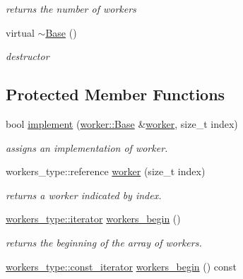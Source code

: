 \begin{DoxyCompactItemize}
\begin{DoxyCompactList}\small\item\em returns the number of workers \end{DoxyCompactList}\item 
virtual \hyperlink{classhryky_1_1task_1_1distributor_1_1_base_a722da881b6c70cfcbde9243abcfbf334}{$\sim$\-Base} ()
\begin{DoxyCompactList}\small\item\em destructor \end{DoxyCompactList}\end{DoxyCompactItemize}
\subsection*{Protected Member Functions}
\begin{DoxyCompactItemize}
\item 
bool \hyperlink{classhryky_1_1task_1_1distributor_1_1_base_aaed765a0ab4b2f79082ca8b66251dc7a}{implement} (\hyperlink{classhryky_1_1task_1_1worker_1_1_base}{worker\-::\-Base} \&\hyperlink{classhryky_1_1task_1_1distributor_1_1_base_a69590e9a4cbe85a69eeb6d5477e994cd}{worker}, size\-\_\-t index)
\begin{DoxyCompactList}\small\item\em assigns an implementation of worker. \end{DoxyCompactList}\item 
\hypertarget{classhryky_1_1task_1_1distributor_1_1_base_a69590e9a4cbe85a69eeb6d5477e994cd}{workers\-\_\-type\-::reference \hyperlink{classhryky_1_1task_1_1distributor_1_1_base_a69590e9a4cbe85a69eeb6d5477e994cd}{worker} (size\-\_\-t index)}\label{classhryky_1_1task_1_1distributor_1_1_base_a69590e9a4cbe85a69eeb6d5477e994cd}

\begin{DoxyCompactList}\small\item\em returns a worker indicated by {\itshape index\/}. \end{DoxyCompactList}\item 
\hypertarget{classhryky_1_1task_1_1distributor_1_1_base_a22e3708e0f85225fb71fd408498711b8}{\hyperlink{classhryky_1_1iterator_1_1random_1_1_mutable}{workers\-\_\-type\-::iterator} \hyperlink{classhryky_1_1task_1_1distributor_1_1_base_a22e3708e0f85225fb71fd408498711b8}{workers\-\_\-begin} ()}\label{classhryky_1_1task_1_1distributor_1_1_base_a22e3708e0f85225fb71fd408498711b8}

\begin{DoxyCompactList}\small\item\em returns the beginning of the array of workers. \end{DoxyCompactList}\item 
\hypertarget{classhryky_1_1task_1_1distributor_1_1_base_aabbf01ac8d82db60c55233d92c229ecb}{\hyperlink{classhryky_1_1iterator_1_1random_1_1_immutable}{workers\-\_\-type\-::const\-\_\-iterator} \hyperlink{classhryky_1_1task_1_1distributor_1_1_base_aabbf01ac8d82db60c55233d92c229ecb}{workers\-\_\-begin} () const }\label{classhryky_1_1task_1_1distributor_1_1_base_aabbf01ac8d82db60c55233d92c229ecb}


\end{DoxyCompactItemize}
